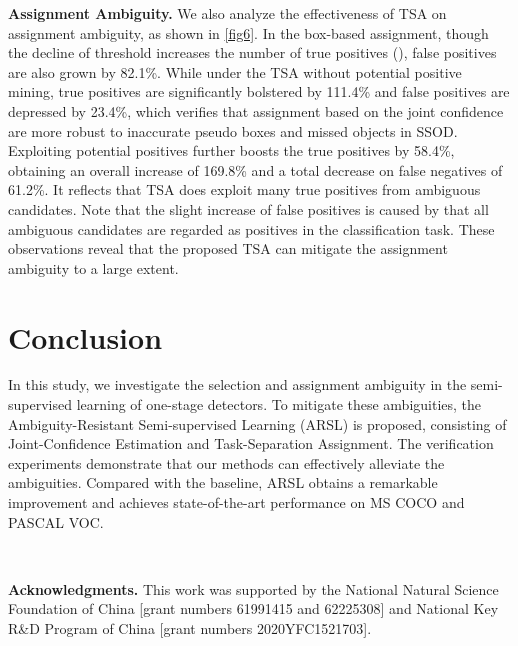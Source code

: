 \documentclass[10pt,twocolumn,letterpaper]{article}
\begin{document}
\noindent\textbf{Assignment Ambiguity.}
We also analyze the effectiveness of TSA on assignment ambiguity, as shown in \cref{fig6}.
In the box-based assignment, though the decline of threshold increases the number of true positives (), false positives are also grown by 82.1\%.
While under the TSA without potential positive mining, true positives are significantly bolstered by 111.4\% and false positives are depressed by 23.4\%, which verifies that assignment based on the joint confidence are more robust to inaccurate pseudo boxes and missed objects in SSOD.
Exploiting potential positives further boosts the true positives by 58.4\%, obtaining an overall increase of 169.8\% and a total decrease on false negatives of 61.2\%.
It reflects that TSA does exploit many true positives from ambiguous candidates.
Note that the slight increase of false positives is caused by that all ambiguous candidates are regarded as positives in the classification task.
These observations reveal that the proposed TSA can mitigate the assignment ambiguity to a large extent.

\section{Conclusion}
\label{sec5}

In this study, we investigate the selection and assignment ambiguity in the semi-supervised learning of one-stage detectors.
To mitigate these ambiguities, the Ambiguity-Resistant Semi-supervised Learning (ARSL) is proposed, consisting of Joint-Confidence Estimation and Task-Separation Assignment.
The verification experiments demonstrate that our methods can effectively alleviate the ambiguities.
Compared with the baseline, ARSL obtains a remarkable improvement and achieves state-of-the-art performance on MS COCO and PASCAL VOC.

~

\noindent\textbf{Acknowledgments.}
This work was supported by the National Natural Science Foundation of China [grant numbers 61991415 and 62225308] and National Key R\&D Program of China [grant numbers 2020YFC1521703].


{\small


}
\end{document}
